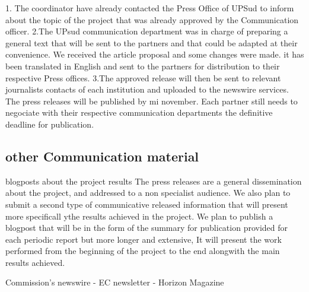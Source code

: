 \documentclass{deliverablereport}
\begin{document}
 1. The coordinator have already contacted the Press Office of UPSud to inform about the topic
 of the project that was already approved by the Communication officer. 
 2.The UPsud communication department was in charge of preparing a general text that will be sent
 to the partners and that could be adapted at their convenience. We received the article proposal 
 and some changes were made. it has been translated in English and sent to the partners 
 for distribution to their respective Press offices. 
 3.The approved release will then be sent to relevant journalists contacts of each institution 
 and uploaded to the newswire services. The press releases will be published by mi november. 
 Each partner still needs to negociate with their respective communication departments the definitive deadline for publication.

\subsection{other Communication material}

 \item blogposts about the project results
 The press releases are a general dissemination about the project, and addressed to 
 a non specialist audience. We also plan to submit a second type of communicative released 
 information that will present more specificall ythe results achieved in the project.
 We plan to publish a blogpost that will be in the form of the summary for publication
 provided for each periodic report but more longer and  extensive, It will present the 
 work performed from the beginning of the project to the end alongwith the main results achieved.
 
 \European Commission's newswire
 - EC newsletter
 - Horizon Magazine
\end{document}
